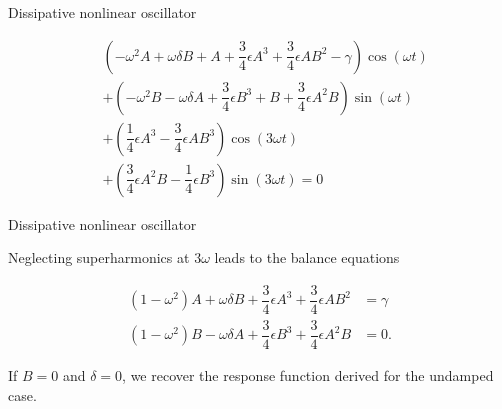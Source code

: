 \documentclass[aspectratio=169]{beamer}
\begin{document}
\begin{frame}[t, c]{Dissipative nonlinear oscillator}{}
  \vfill
  \large

  \[
  \begin{aligned}
    & \left( -\omega^2 A + \omega \delta B + A + \dfrac{3}{4} \epsilon A^3 + \dfrac{3}{4} \epsilon AB^2 - \gamma \right) \cos(\omega t) \\
    & + \left( -\omega^2 B - \omega \delta A + \dfrac{3}{4} \epsilon B^3 + B + \dfrac{3}{4} \epsilon A^2 B \right) \sin(\omega t) \\
    & + \left( \dfrac{1}{4} \epsilon A^3 - \dfrac{3}{4} \epsilon AB^3 \right) \cos(3\omega t) \\
    & + \left( \dfrac{3}{4} \epsilon A^2 B - \dfrac{1}{4} \epsilon B^3 \right) \sin(3\omega t) = 0
  \end{aligned}
  \]

  \vfill
\end{frame}

\begin{frame}[t, c]{Dissipative nonlinear oscillator}{}
  \vfill
  \large

  Neglecting superharmonics at $3 \omega$ leads to the balance equations

  \[
  \begin{aligned}
    \left(1 - \omega^2 \right) A + \omega \delta B + \dfrac{3}{4} \epsilon A^3 + \dfrac{3}{4} \epsilon A B^2 & = \gamma \\
    \left( 1 - \omega^2 \right) B - \omega \delta A + \dfrac{3}{4} \epsilon B^3 + \dfrac{3}{4} \epsilon A^2 B & = 0.
  \end{aligned}
  \]

  If $B = 0$ and $\delta = 0$, we recover the response function derived for the undamped case.

  \vfill
\end{frame}
\end{document}
